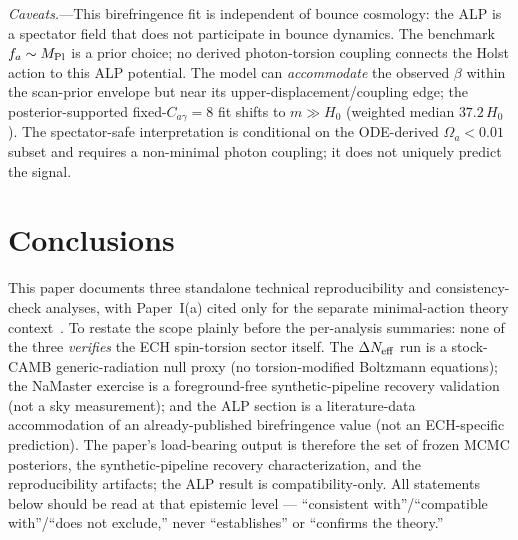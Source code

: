 \documentclass[aps,prd,twocolumn,superscriptaddress,showpacs,preprintnumbers,nofootinbib,longbibliography,floatfix]{revtex4-2}
\newcommand{\MPl}{M_{\rm Pl}}
\newcommand{\Neff}{N_{\rm eff}}
\begin{document}
\textit{Caveats.}---This birefringence fit is independent of bounce
cosmology: the ALP is a spectator field that does not participate in bounce
dynamics. The benchmark $f_a\sim\MPl$ is a prior choice; no derived
photon-torsion coupling connects the Holst action to this ALP potential. The model can
\textit{accommodate} the observed $\beta$ within the scan-prior envelope
but near its upper-displacement/coupling edge; the posterior-supported
fixed-$C_{a\gamma}\!=\!8$ fit shifts to $m\!\gg\!H_0$ (weighted median $37.2\,H_0$).
The spectator-safe interpretation is conditional on the ODE-derived
$\Omega_a<0.01$ subset and requires a non-minimal photon coupling; it
does not uniquely predict the signal.


\section{Conclusions}\label{sec:conclusions}

This paper documents three standalone technical reproducibility and
consistency-check analyses, with Paper~I(a) cited only for the separate
minimal-action theory context~\cite{Golden2026P1a}. To restate the scope plainly before the
per-analysis summaries: none of the three \emph{verifies} the ECH spin-torsion
sector itself. The $\Delta\Neff$ run is a stock-CAMB generic-radiation null
proxy (no torsion-modified Boltzmann equations); the NaMaster exercise is a
foreground-free synthetic-pipeline recovery validation (not a sky measurement);
and the ALP section is a literature-data accommodation of an already-published
birefringence value (not an ECH-specific prediction). The paper's load-bearing
output is therefore the set of frozen MCMC posteriors, the synthetic-pipeline
recovery characterization, and the reproducibility artifacts; the ALP result is
compatibility-only. All statements below should be read at that epistemic level
--- ``consistent with''/``compatible with''/``does not exclude,'' never
``establishes'' or ``confirms the theory.''
\end{document}
